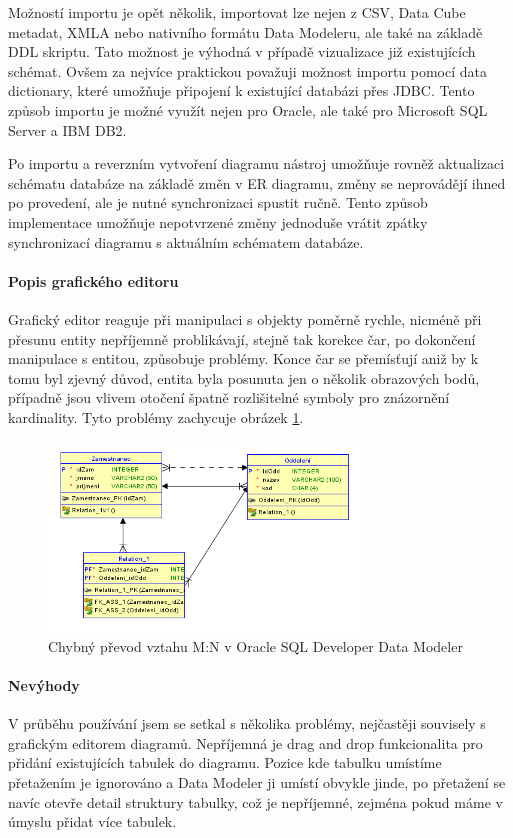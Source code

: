 \documentclass[czech,bachelor,public,dept460,male,oneside]{diploma}
\begin{document}
		Možností importu je opět několik, importovat lze nejen z CSV, Data Cube metadat, XMLA nebo nativního formátu Data Modeleru, ale také na základě DDL skriptu. Tato možnost je výhodná v případě vizualizace již existujících schémat. Ovšem za nejvíce praktickou považuji možnost importu pomocí data dictionary, které umožňuje připojení k existující databázi přes JDBC. Tento způsob importu je možné využít nejen pro Oracle, ale také pro Microsoft SQL Server a IBM DB2.
		
		Po importu a reverzním vytvoření diagramu nástroj umožňuje rovněž aktualizaci schématu databáze na základě změn v ER diagramu, změny se neprovádějí ihned po provedení, ale je nutné synchronizaci spustit ručně. Tento způsob implementace umožňuje nepotvrzené změny jednoduše vrátit zpátky synchronizací diagramu s aktuálním schématem databáze.
		
		\paragraph{Popis grafického editoru}
		Grafický editor reaguje při manipulaci s objekty poměrně rychle, nicméně při přesunu entity nepříjemně problikávají, stejně tak korekce čar, po dokončení manipulace s entitou, způsobuje problémy. Konce čar se přemísťují aniž by k tomu byl zjevný důvod, entita byla posunuta jen o několik obrazových bodů, případně jsou vlivem otočení špatně rozlišitelné symboly pro znázornění kardinality. Tyto problémy zachycuje obrázek \ref{fig:oracleBug}.
		
		\begin{figure}[!h]
			\centering
			\includegraphics[width=0.75\textwidth]{Figures/EditorOracleLogic}
			\caption[Chybný převod vztahu M:N v Oracle SQL Developer Data Modeler]{Chybný převod vztahu M:N v Oracle SQL Developer Data Modeler}
			\label{fig:oracleBug}
		\end{figure}
		
		\paragraph{Nevýhody}
		V průběhu používání jsem se setkal s několika problémy, nejčastěji souvisely s grafickým editorem diagramů. Nepříjemná je drag and drop funkcionalita pro přidání existujících tabulek do diagramu. Pozice kde tabulku umístíme přetažením je ignorováno a Data Modeler ji umístí obvykle jinde, po přetažení se navíc otevře detail struktury tabulky, což je nepříjemné, zejména pokud máme v úmyslu přidat více tabulek. 
		
\end{document}
